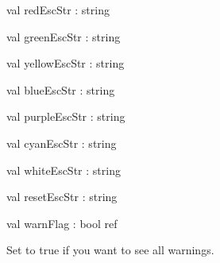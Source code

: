 \documentclass[11pt]{article}
\begin{document}
\label{val:Errormsg.redEscStr}\begin{ocamldoccode}
val redEscStr : string
\end{ocamldoccode}




\label{val:Errormsg.greenEscStr}\begin{ocamldoccode}
val greenEscStr : string
\end{ocamldoccode}




\label{val:Errormsg.yellowEscStr}\begin{ocamldoccode}
val yellowEscStr : string
\end{ocamldoccode}




\label{val:Errormsg.blueEscStr}\begin{ocamldoccode}
val blueEscStr : string
\end{ocamldoccode}




\label{val:Errormsg.purpleEscStr}\begin{ocamldoccode}
val purpleEscStr : string
\end{ocamldoccode}




\label{val:Errormsg.cyanEscStr}\begin{ocamldoccode}
val cyanEscStr : string
\end{ocamldoccode}




\label{val:Errormsg.whiteEscStr}\begin{ocamldoccode}
val whiteEscStr : string
\end{ocamldoccode}




\label{val:Errormsg.resetEscStr}\begin{ocamldoccode}
val resetEscStr : string
\end{ocamldoccode}




\label{val:Errormsg.warnFlag}\begin{ocamldoccode}
val warnFlag : bool ref
\end{ocamldoccode}
\begin{ocamldocdescription}
Set to true if you want to see all warnings.


\end{ocamldocdescription}
\end{document}
